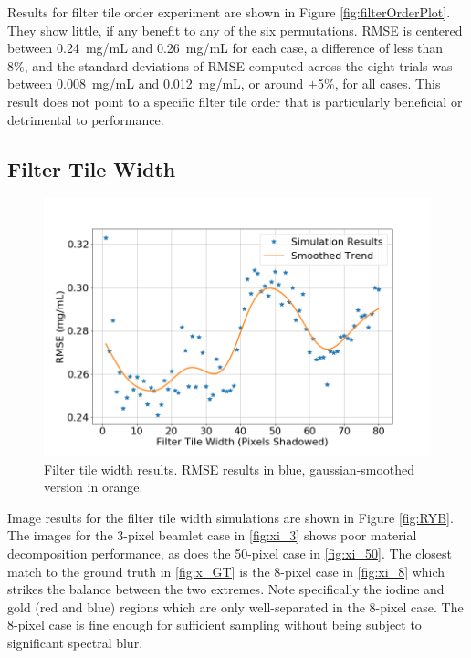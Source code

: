 \documentclass[12pt]{spieman}  %
\begin{document}
\begin{spacing}{1}
Results for filter tile order experiment are shown in Figure \ref{fig:filterOrderPlot}. They show little, if any benefit to any of the six permutations. RMSE is centered between 0.24~mg/mL and 0.26~mg/mL for each case, a difference of less than 8\%, and the standard deviations of RMSE computed across the eight trials was between 0.008~mg/mL and 0.012~mg/mL, or around $\pm$5\%, for all cases. This result does not point to a specific filter tile order that is particularly beneficial or detrimental to performance.

\vspace{-3mm}

\subsection{Filter Tile Width}

\vspace{-2mm}

\begin{figure}
    \vspace{-10mm}
    \centering
    \includegraphics[clip,trim={0.8cm 0.4cm 1.8cm 2.2cm}, scale = 0.3]{figures/filterTileWidthPlot.png}
    \caption{Filter tile width results. RMSE results in blue, gaussian-smoothed version in orange.}  
    \label{fig:filterTileWidthPlot}
\end{figure}

Image results for the filter tile width simulations are shown in Figure \ref{fig:RYB}. The images for the 3-pixel beamlet case in \ref{fig:xi_3} shows poor material decomposition performance, as does the 50-pixel case in \ref{fig:xi_50}. The closest match to the ground truth in \ref{fig:x_GT} is the 8-pixel case in \ref{fig:xi_8} which strikes the balance between the two extremes. Note specifically the iodine and gold (red and blue) regions which are only well-separated in the 8-pixel case. The 8-pixel case is fine enough for sufficient sampling without being subject to significant spectral blur.


\end{spacing}
\end{document}
